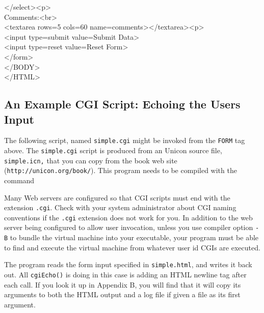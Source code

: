 {{{\textless}/select{\textgreater}{\textless}p{\textgreater} \\
Comments:{\textless}br{\textgreater} \\
{\textless}textarea rows=5 cols=60
name={\textquotedbl}comments{\textquotedbl}{\textgreater}{\textless}/textarea{\textgreater}{\textless}p{\textgreater} \\
{\textless}input type={\textquotedbl}submit{\textquotedbl}
value={\textquotedbl}Submit Data{\textquotedbl}{\textgreater} \\
{\textless}input type={\textquotedbl}reset{\textquotedbl}
value={\textquotedbl}Reset Form{\textquotedbl}{\textgreater} \\
{\textless}/form{\textgreater} \\
{\textless}/BODY{\textgreater} \\
{\textless}/HTML{\textgreater}
}


\subsection{An Example CGI Script: Echoing the User{\textquotesingle}s
Input}

The following script, named \texttt{simple.cgi} might be invoked from
the \texttt{FORM} tag above. The \texttt{simple.cgi} script is produced
from an Unicon source file, \texttt{simple.icn}\texttt{,} that you can
copy from the book web site
(\texttt{http://unicon.org/book/}). This program needs to
be compiled with the command


Many Web servers are configured so that CGI scripts must end with the
extension \texttt{.cgi}. Check with your system administrator about CGI
naming conventions if the \texttt{.cgi} extension does not work for
you. In addition to the web server being configured to allow user
invocation, unless you use compiler option \texttt{{}-B} to bundle the
virtual machine into your executable, your program must be able to find
and execute the virtual machine from whatever user id
CGI{\textquotesingle}s are executed.

The program reads the form input specified in \texttt{simple.html}, and
writes it back out. All \texttt{cgiEcho()} is doing in this case is
adding an HTML newline tag after each call. If you look it up in
Appendix B, you will find that it will copy its arguments to both the
HTML output and a log file if given a file as its first argument.

}
